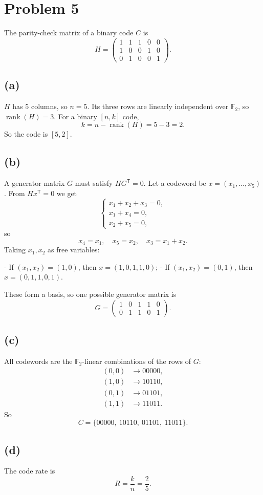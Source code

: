 \section*{Problem 5}

The parity-check matrix of a binary code \(C\) is
\[
H =
\begin{pmatrix}
1 & 1 & 1 & 0 & 0\\
1 & 0 & 0 & 1 & 0\\
0 & 1 & 0 & 0 & 1
\end{pmatrix}.
\]

\subsection*{(a)}
\(H\) has \(5\) columns, so \(n=5\). Its three rows are linearly independent over \(\mathbb{F}_2\),
so \(\operatorname{rank}(H)=3\). For a binary \([n,k]\) code,
\[
k = n - \operatorname{rank}(H) = 5-3 = 2.
\]
So the code is \([5,2]\).

\subsection*{(b)}
A generator matrix \(G\) must satisfy \(HG^{\mathsf T}=0\).  
Let a codeword be \(x=(x_1,\dots,x_5)\). From \(Hx^{\mathsf T}=0\) we get
\[
\begin{cases}
x_1 + x_2 + x_3 = 0,\\
x_1 + x_4 = 0,\\
x_2 + x_5 = 0,
\end{cases}
\]
so
\[
x_4 = x_1,\quad x_5 = x_2,\quad x_3 = x_1 + x_2.
\]
Taking \(x_1,x_2\) as free variables:

- If \((x_1,x_2)=(1,0)\), then \(x=(1,0,1,1,0)\);
- If \((x_1,x_2)=(0,1)\), then \(x=(0,1,1,0,1)\).

These form a basis, so one possible generator matrix is
\[
G =
\begin{pmatrix}
1 & 0 & 1 & 1 & 0\\
0 & 1 & 1 & 0 & 1
\end{pmatrix}.
\]

\subsection*{(c)}
All codewords are the \(\mathbb{F}_2\)-linear combinations of the rows of \(G\):
\[
\begin{aligned}
(0,0) &\to 00000,\\
(1,0) &\to 10110,\\
(0,1) &\to 01101,\\
(1,1) &\to 11011.
\end{aligned}
\]
So
\[
C = \{00000,\ 10110,\ 01101,\ 11011\}.
\]

\subsection*{(d)}
The code rate is
\[
R = \frac{k}{n} = \frac{2}{5}.
\]
